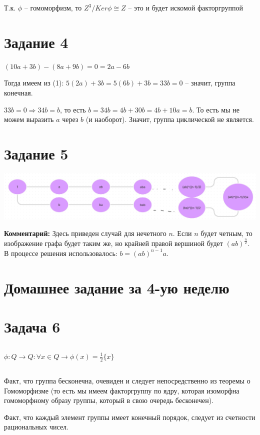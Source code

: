 \documentclass[12pt, a4paper]{article}
\theoremstyle{definition}
\begin{document}
    Т.к. $\phi$ -- гомоморфизм, то $Z^3/Ker \phi \cong Z$ -- это и будет искомой факторгруппой

    \section*{Задание 4}

    $(10a + 3b) - (8a + 9b) = 0 = 2a - 6b$

    Тогда имеем из (1): $5(2a) + 3b = 5(6b) + 3b = 33b = 0$ -- значит, группа конечная.

    $33b = 0 \Rightarrow 34b = b$, то есть $b = 34b = 4b + 30b = 4b + 10a = b$. То есть мы не можем выразить $a$ через $b$ (и наоборот).
    Значит, группа циклической не является.

    \section*{Задание 5}

        \begin{center}
            \includegraphics[scale=0.5]{picture1}
        \end{center}

    \textbf{Комментарий:} Здесь приведен случай для нечетного $n$. Если $n$ будет четным, то изображение графа будет таким же,
    но крайней правой вершиной будет $(ab)^{\frac{n}{2}}$. В процессе решения использовалось: $b = (ab)^{n-1}a$.

    \section{Домашнее задание за 4-ую неделю}

    \section*{Задача 6}

    \subsection{}
        $\phi : Q \rightarrow Q : {\forall x \in Q \rightarrow \phi(x) = \frac{1}{2}\{x\}}$

    \subsection{}
        Факт, что группа бесконечна, очевиден и следует непосредственно из теоремы о Гомоморфизме (то есть мы имеем факторгруппу по ядру,
        которая изоморфна гомоморфному образу группы, который в свою очередь бесконечен).

        Факт, что каждый элемент группы имеет конечный порядок, следует из счетности рациональных чисел.
\end{document}
